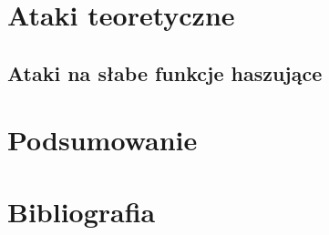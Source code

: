\documentclass[12pt,a4paper,twoside]{article}
\begin{document}
\section{Ataki teoretyczne}

\subsection{Ataki na słabe funkcje haszujące}

\subsubsection{}

\subsubsection{}

\subsubsection{}

\section{Podsumowanie}

\newpage
\section{Bibliografia}
\begingroup
\renewcommand{\section}[2]{}


\endgroup
\end{document}

